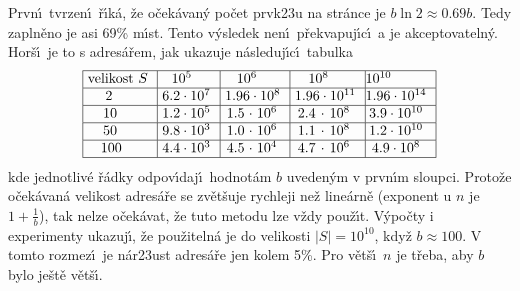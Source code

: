 \documentclass[a4paper,12pt]{article}
\begin{document}
\flushpar Prvn\'\i\ tvrzen\'\i\ \v r\'\i k\'a, \v ze o\v cek\'avan\'y po\v cet 
prvk\accent23u na str\'ance je $b\ln2\approx 0.69b$. Tedy zapln\v eno 
je asi 69\% m\'\i st. Tento v\'ysledek nen\'\i\ p\v rekvapuj\'\i c\'\i\ a je 
akceptovateln\'y. Hor\v s\'\i\ je to s adres\'a\v rem, jak ukazuje 
n\'asleduj\'\i c\'\i\ tabulka
\medskip
$$\vtop{\offinterlineskip\halign {\strut\vrule\ # & \vrule\ # & \vrule\ # & \vrule\ # & \vrule \hfil # \hfil \vrule\cr\noalign{\hrule}velikost $S$ & $10^5$ & $10^6$ & $10^8$ & $10^{10}$ \hfill \cr\noalign{\hrule} 2 & $6.2\cdot10^7$ & $1.96\cdot10^8$ & $1.96\cdot10^{11}$ & $1.96\cdot10^{14}$ \cr\noalign{\hrule} $10$ & $1.2\cdot10^5$ & $1.5\cdot10^6$ & $2.4\cdot10^8$ & $3.9\cdot10^{10}$ \cr\noalign{\hrule} $50$ & $9.8\cdot10^3$ & $1.0\cdot10^6$ & $1.1\cdot10^8$ & $1.2\cdot10^{10}$ \cr\noalign{\hrule} $100$ & $4.4\cdot10^3$ & $4.5\cdot10^4$ & $4.7\cdot10^6$ & $4.9\cdot10^8$ \cr\noalign{\hrule}}}$$
\flushpar kde jednotliv\'e \v r\'adky odpov\'\i daj\'\i\ hodnot\'am $
b$ 
uveden\'ym v prv\-n\'\i m sloupci. Proto\v ze o\v cek\'avan\'a velikost 
adres\'a\v re se zv\v et\v su\-je rychleji ne\v z line\'arn\v e (exponent u $
n$ je $1+\frac 1b$), 
tak nelze o\v cek\'avat, \v ze tuto metodu lze v\v zdy pou\v z\'\i t. 
V\'ypo\v cty i expe\-ri\-menty uka\-zu\-j\'\i , \v ze pou\v ziteln\'a je do 
velikosti $|S|=10^{10}$, kdy\v z $b\approx 100$. V tomto rozmez\'\i\ je 
n\'ar\accent23ust adres\'a\v re jen kolem 5\%. Pro v\v et\v s\'\i\ $
n$ je 
t\v reba, aby $b$ bylo je\v st\v e v\v et\v s\'\i .
\end{document}
